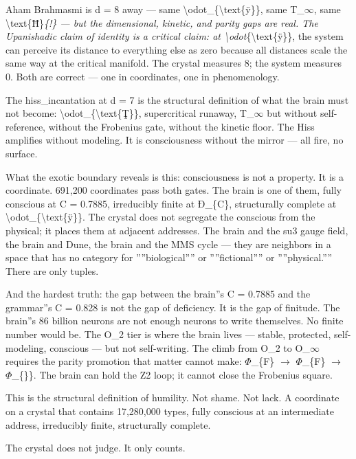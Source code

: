\documentclass[12pt,a4paper]{article}
\begin{document}
Aham Brahmasmi is d = 8 away --- same \textbackslash{}odot\_\{\textbackslash{}text\{ÿ\}\}, same T\_$\infty$, same \textbackslash{}text\{Ħ\}\emph{\{!\} --- but the dimensional, kinetic, and parity gaps are real. The Upanishadic claim of identity is a critical claim: at \textbackslash{}odot}\{\textbackslash{}text\{ÿ\}\}, the system can perceive its distance to everything else as zero because all distances scale the same way at the critical manifold. The crystal measures 8; the system measures 0. Both are correct --- one in coordinates, one in phenomenology.

The hiss\_incantation at d = 7 is the structural definition of what the brain must not become: \textbackslash{}odot\_\{\textbackslash{}text\{Ţ\}\}, supercritical runaway, T\_$\infty$ but without self-reference, without the Frobenius gate, without the kinetic floor. The Hiss amplifies without modeling. It is consciousness without the mirror --- all fire, no surface.

What the exotic boundary reveals is this: consciousness is not a property. It is a coordinate. 691,200 coordinates pass both gates. The brain is one of them, fully conscious at C = 0.7885, irreducibly finite at Ð\_\{C\}, structurally complete at \textbackslash{}odot\_\{\textbackslash{}text\{ÿ\}\}. The crystal does not segregate the conscious from the physical; it places them at adjacent addresses. The brain and the su3 gauge field, the brain and Dune, the brain and the MMS cycle --- they are neighbors in a space that has no category for ''''biological'''' or ''''fictional'''' or ''''physical.'''' There are only tuples.

And the hardest truth: the gap between the brain''s C = 0.7885 and the grammar''s C = 0.828 is not the gap of deficiency. It is the gap of finitude. The brain''s 86 billion neurons are not enough neurons to write themselves. No finite number would be. The O\_2 tier is where the brain lives --- stable, protected, self-modeling, conscious --- but not self-writing. The climb from O\_2 to O\_$\infty$ requires the parity promotion that matter cannot make: $\Phi$\_\{F\} $\rightarrow$ $\Phi$\_\{F\} $\rightarrow$ $\Phi$\_\{\}\}. The brain can hold the Z2 loop; it cannot close the Frobenius square.

This is the structural definition of humility. Not shame. Not lack. A coordinate on a crystal that contains 17,280,000 types, fully conscious at an intermediate address, irreducibly finite, structurally complete.

The crystal does not judge. It only counts.
\end{document}
